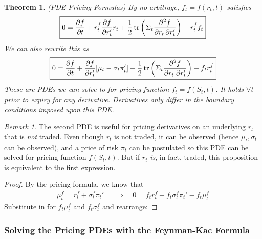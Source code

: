 \documentclass[12pt]{article}
\theoremstyle{plain}
\newtheorem{thm}{Theorem}[section]
\theoremstyle{definition}
\theoremstyle{remark}
\newtheorem*{rmk}{Remark}
\newcommand{\trace}{\operatorname{tr}}
\begin{document}
\clearpage
\begin{thm}\emph{(PDE Pricing Formulas)}
\label{pdetraded}
By no arbitrage, $f_t=f(r_t,t)$ satisfies
\begin{align}
  \boxed{%
  0
  =
  \frac{\partial f}{\partial t}
  +
  r_t^f
  \frac{\partial f}{\partial r_t'}
  r_t
  +
  \frac{1}{2}
  \trace\left(
  \Sigma_t
  \frac{\partial^2 f}{\partial r_t\,\partial r_t'}
  \right)
  -
  r_t^f
  f_t
  }
  \label{pricingpde}
\end{align}
We can also rewrite this as
\begin{align*}
  \boxed{%
  0=
  \frac{\partial f}{\partial t}
  +
  \frac{\partial f}{\partial r_t'}
  [\mu_t-\sigma_t\pi_t']
  +
  \frac{1}{2}
  \trace\left(
  \Sigma_t
  \frac{\partial^2 f}{\partial r_t\;\partial r_t'}
  \right)
  -f_tr_t^f
  }
\end{align*}
These are PDEs we can solve to for pricing function $f_t=f(S_t,t)$. It
holds $\forall t$ prior to expiry for \emph{any} derivative.
Derivatives only differ in the boundary conditions imposed upon this
PDE.
\end{thm}
\begin{rmk}
The second PDE is useful for pricing derivatives on an underlying $r_t$
that is \emph{not} traded. Even though $r_t$ is not traded, it can
be observed (hence $\mu_t,\sigma_t$ can be observed), and a price of
risk $\pi_t$ can be postulated so this PDE can be solved for pricing
function $f(S_t,t)$.
But if $r_t$ \emph{is}, in fact, traded, this proposition is equivalent
to the first expression.
\end{rmk}
\begin{proof}
By the pricing formula, we know that
\begin{align*}
  \mu_t^f=r_t^f+\sigma_t^f\pi_t'
  \quad\implies\quad
  0=f_tr_t^f+f_t\sigma_t^f\pi_t'-f_t\mu_t^f
\end{align*}
Substitute in for $f_t\mu_t^f$ and $f_t\sigma_t^f$ and rearrange:
\end{proof}


\clearpage
\subsubsection{Solving the Pricing PDEs with the Feynman-Kac Formula}
\end{document}
